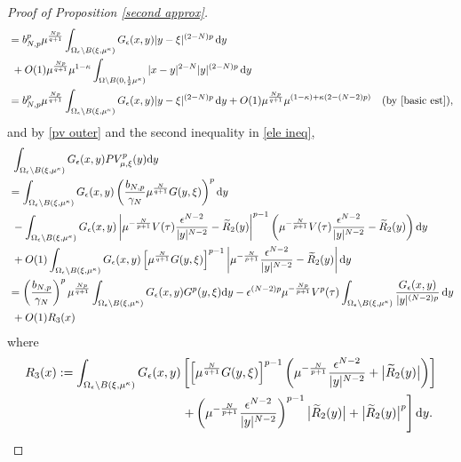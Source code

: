 \documentclass[reqno]{amsart}
\theoremstyle{remark}
\newcommand{\ep}{\epsilon}
\newcommand{\ga}{\gamma}
\newcommand{\wtr}{\widetilde{R}}
\newcommand{\dy}{\textup{d}y}
\newcommand{\mx}{{\mu,\xi}}
\renewcommand{\(}{\left(}
\renewcommand{\)}{\right)}
\numberwithin{equation}{section}
\begin{document}
\begin{proof}[Proof of Proposition \ref{second approx}]
\begin{equation}
\begin{aligned}
&= b_{N,p}^p\mu^{\frac{Np}{q+1}} \int_{\Omega_\ep\setminus B(\xi,\mu^\kappa)} G_\ep(x,y) |y-\xi|^{(2-N)p}\, \dy \\
&\ + O(1)\mu^{\frac{Np}{q+1}}\mu^{1-\kappa}\int_{\Omega \setminus B(0,\frac{1}{2}\mu^\kappa)}|x-y|^{2-N} |y|^{(2-N)p}\, \dy \\
&= b_{N,p}^p\mu^{\frac{Np}{q+1}} \int_{\Omega_\ep\setminus B(\xi,\mu^\kappa)} G_\ep(x,y) |y-\xi|^{(2-N)p}\, \dy + O(1)\mu^{\frac{Np}{q+1}}\mu^{(1-\kappa)+ \kappa(2-(N-2)p)} &(\textup{by } \eqref{basic est}),
\end{aligned}
\end{equation}
and by \eqref{pv outer} and the second inequality in \eqref{ele ineq},
\begin{equation}\label{u rep 1}
\begin{aligned}
&\ \int_{\Omega_\ep\setminus B(\xi,\mu^\kappa)} G_\ep(x,y) PV_\mx^p(y)\dy \\
&= \int_{\Omega_\ep\setminus B(\xi,\mu^\kappa)} G_\ep(x,y) \(\frac{b_{N,p}}{\ga_N}\mu^{\frac{N}{q+1}}G(y,\xi)\)^p \dy \\
&\ -\int_{\Omega_\ep\setminus B(\xi,\mu^\kappa)} G_\ep(x,y) \left|\mu^{-\frac{N}{p+1}}V(\tau) \frac{\ep^{N-2}}{|y|^{N-2}}-\wtr_2(y)\right|^{p-1} \(\mu^{-\frac{N}{p+1}}V(\tau) \frac{\ep^{N-2}}{|y|^{N-2}}-\wtr_2(y)\) \dy \\
&\ + O(1)\int_{\Omega_\ep\setminus B(\xi,\mu^\kappa)} G_\ep(x,y) \left[\mu^{\frac{N}{q+1}}G(y,\xi) \right]^{p-1} \left|\mu^{-\frac{N}{p+1}} \frac{\ep^{N-2}}{|y|^{N-2}} -\wtr_2(y) \right|\dy \\
&= \(\frac{b_{N,p}}{\ga_N}\)^p\mu^{\frac{Np}{q+1}}\int_{\Omega_\ep\setminus B(\xi,\mu^\kappa)} G_\ep(x,y)G^p(y,\xi)\dy
- \ep^{(N-2)p}\mu^{-\frac{Np}{p+1}}V^p(\tau) \int_{\Omega_\ep\setminus B(\xi,\mu^\kappa)} \frac{G_\ep(x,y)}{|y|^{(N-2)p}}\, \dy\\
&\ + O(1)R_3(x)
\end{aligned}
\end{equation}
where
\begin{equation}\label{R3}
\begin{aligned}
R_3(x) := \int_{\Omega_\ep\setminus B(\xi,\mu^\kappa)} G_\ep(x,y) &\left[\left[\mu^{\frac{N}{q+1}}G(y,\xi) \right]^{p-1}\(\mu^{-\frac{N}{p+1}}\frac{\ep^{N-2}}{|y|^{N-2}} +\big|\wtr_2(y)\big|\) \right] \\
&\left. + \(\mu^{-\frac{N}{p+1}} \frac{\ep^{N-2}}{|y|^{N-2}}\)^{p-1} \big|\wtr_2(y)\big|+\big|\wtr_2(y)\big|^p \right]\dy.
\end{aligned}
\end{equation}

\end{proof}
\end{document}
